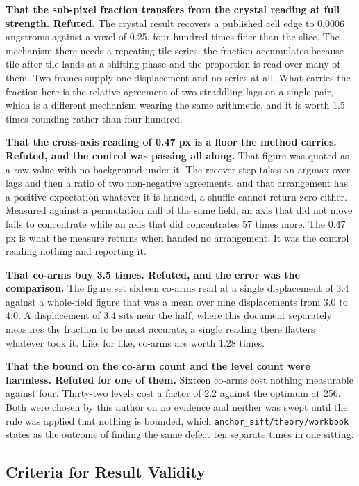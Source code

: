 \textbf{That the sub-pixel fraction transfers from the crystal reading at full strength. Refuted.}
The crystal result recovers a published cell edge to 0.0006 angstroms against a voxel of 0.25, four
hundred times finer than the slice. The mechanism there needs a repeating tile series: the fraction
accumulates because tile after tile lands at a shifting phase and the proportion is read over many
of them. Two frames supply one displacement and no series at all. What carries the fraction here is
the relative agreement of two straddling lags on a single pair, which is a different mechanism
wearing the same arithmetic, and it is worth 1.5 times rounding rather than four hundred.

\textbf{That the cross-axis reading of 0.47 px is a floor the method carries. Refuted, and the
control was passing all along.} That figure was quoted as a raw value with no background under it.
The recover step takes an argmax over lags and then a ratio of two non-negative agreements, and that
arrangement has a positive expectation whatever it is handed, a shuffle cannot return zero
either. Measured against a permutation null of the same field, an axis that did not move fails to
concentrate while an axis that did concentrates 57 times more. The 0.47 px is what the measure
returns when handed no arrangement. It was the control reading nothing and reporting it.

\textbf{That co-arms buy 3.5 times. Refuted, and the error was the comparison.} The figure set
sixteen co-arms read at a single displacement of 3.4 against a whole-field figure that was a mean
over nine displacements from 3.0 to 4.0. A displacement of 3.4 sits near the half, where this
document separately measures the fraction to be most accurate, a single reading there flatters
whatever took it. Like for like, co-arms are worth 1.28 times.

\textbf{That the bound on the co-arm count and the level count were harmless. Refuted for one of
them.} Sixteen co-arms cost nothing measurable against four. Thirty-two levels cost a factor of 2.2
against the optimum at 256. Both were chosen by this author on no evidence and neither was swept
until the rule was applied that nothing is bounded, which
\texttt{anchor\_sift/\allowbreak{}theory/\allowbreak{}workbook} states as the outcome of finding the
same defect ten separate times in one sitting.

\subsection{Criteria for Result Validity}

